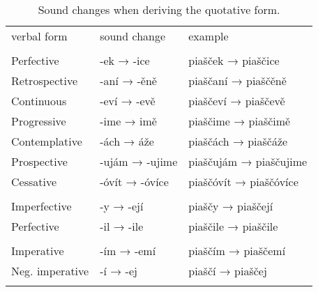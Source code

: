 \begin{table}
\footnotesize \sffamily
	\caption{Sound changes when deriving the quotative form.}
	\medskip
	\label{tbl:quotative}
	\begin{tabu} to 
		\toprule \addlinespace
		{\sc verbal form}			&	{\sc sound change}				& {\sc example}\\ \addlinespace
		\midrule \addlinespace

			\\ \addlinespace

				\quad Perfective &
				-ek → -ice &
				piašček → piaščice\\ \addlinespace

				\quad Retrospective &
				-aní → -ěně &
				piaščaní → piaščěně\\ \addlinespace

				\quad Continuous &
				-eví → -evě &
				piaščeví → piaščevě\\ \addlinespace

				\quad Progressive &
				-ime → imě &
				piaščime → piaščimě \\ \addlinespace

				\quad Contemplative &
				-ách → áže &
				piaščách → piaščáže \\ \addlinespace

				\quad Prospective &
				-ujám → -ujime &
				piaščujám → piaščujime\\ \addlinespace

				\quad Cessative &
				-óvít → -óvíce &
				piaščóvít → piaščóvíce\\ \addlinespace

			\\ \addlinespace

				\quad Imperfective &
				-y → -ejí &
				piaščy → piaščejí\\ \addlinespace

				\quad Perfective &
				-il → -ile &
				piaščile → piaščile\\ \addlinespace

			\\ \addlinespace

				\quad Imperative &
				-ím → -emí &
				piaščím → piaščemí\\ \addlinespace

				\quad Neg. imperative &
				-í → -ej &
				piaščí → piaščej \\ \addlinespace


\end{tabu}
\end{table}
